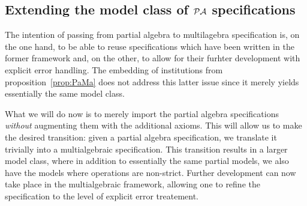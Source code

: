 \documentclass[10pt]{article}
\begin{document}
\subsection{Extending the model class of ${\mathcal{PA}}$ specifications}\label{sub:import}
The intention of passing from partial algebra to multilagebra specification
is, on the one hand, to be able to reuse specifications which have been written in the former
framework and, on the other, to allow for their furhter development with
explicit error handling. The embedding of institutions from
proposition~\ref{prop:PaMa} does not address this latter issue since it
merely yields essentially the same model class. 

What we will do now is to merely import the partial algebra specifications
{\em without} augmenting them with the additional axioms. This will 
allow us to make the desired
transition: given a partial algebra
specification, we translate it trivially  into a multialgebraic
specification. This transition results in a larger model class, where in
addition to essentially the same partial models, we also have the models
where operations are non-strict.
Further development can now take
place in the multialgebraic framework, allowing one to refine the
specification to the level of explicit error treatement.
%
\end{document}
